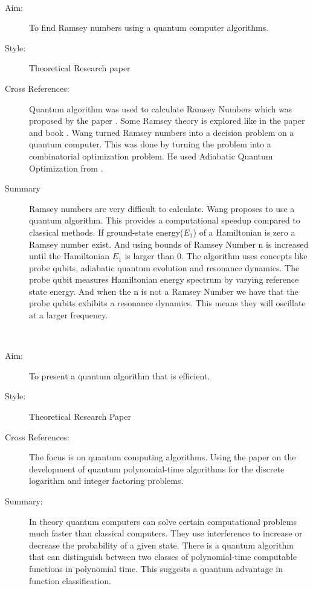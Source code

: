 \documentclass{Assignment}
\begin{document}
	\newpage
\cite{PhysRevA.93.032301}~
\begin{description}
	\item [Aim:]
	To find Ramsey numbers using a quantum computer algorithms.
	\item [Style:]
	Theoretical Research paper
	\item [Cross References:]
	Quantum algorithm was used to calculate Ramsey Numbers which was proposed by the paper \cite{gaitan2012ramsey}.
	Some Ramsey theory is explored like in the paper \cite{burr1981generalized} and book \cite{graham1980ramsey}.
	Wang turned Ramsey numbers into a decision problem on a quantum computer.
	This was done by turning the problem into a combinatorial optimization problem.
	He used Adiabatic Quantum Optimization from \cite{farhi2000quantum}.
	
	\item [Summary]
	Ramsey numbers are very difficult to calculate.
	Wang proposes to use a quantum algorithm.
	This provides a computational speedup compared to classical methods.
	If ground-state energy($E_1$) of a Hamiltonian is zero a Ramsey number exist. 
	And using bounds of Ramsey Number n is increased until the Hamiltonian $E_1$ is larger than 0.
	The algorithm uses concepts like probe qubits, adiabatic quantum evolution and resonance dynamics. 
	The probe qubit measures Hamiltonian energy spectrum by varying reference state energy. 
	And when the n is not a Ramsey Number we have that the probe qubits exhibits a resonance dynamics.
	This means they will oscillate at a larger frequency.
\end{description}


\newpage
\cite{doi:10.1137/S0097539796298637}~
\begin{description}
	\item[Aim:]
	To present a quantum algorithm that is efficient.
	
	\item [Style:]
	Theoretical Research Paper
	\item [Cross References:]
	The focus is on quantum computing algorithms.
	Using the paper \cite{shor1994algorithms} on the development of quantum polynomial-time algorithms for the discrete logarithm and integer factoring problems.
	
	
	\item[Summary:]
	 In theory quantum computers can solve certain computational problems much faster than classical computers.
	They use interference to increase or decrease the probability of a given state.
	There is a quantum algorithm that can distinguish between two classes of polynomial-time computable functions in polynomial time. 
	This suggests a quantum advantage in function classification. 
\end{description}
\end{document}
